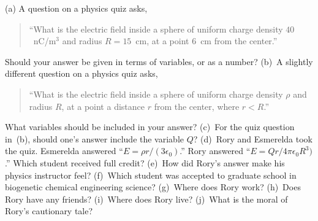 \begin{Exercise}
\label{rory_messed_up}
(a) A question on a physics quiz asks, 
\begin{quotation} 
``What is the electric field inside a sphere of uniform charge density $40$~nC/m$^3$ and radius $R=15$~cm, at a point 6~cm from the center.''
\end{quotation}  
Should your answer be given in terms of variables, or as a number?  (b)~A slightly different question on a physics quiz asks,
\begin{quotation} 
``What is the electric field inside a sphere of uniform charge density $\rho$ and radius $R$, at a point a distance $r$ from the center, where $r<R$.'' 
\end{quotation}  
What variables should be included in your answer?  
(c)~For the quiz question in~(b), should one's answer include the variable $Q$?  
(d)~Rory and Esmerelda took the quiz.  Esmerelda answered ``$E=\rho r/(3\epsilon_0)$.''  Rory answered ``$E=Qr / 4\pi \epsilon_0 R^3)$.'' Which student received full credit? 
(e)~How did Rory's answer make his physics instructor feel?  
(f)~Which student was accepted to graduate school in biogenetic chemical engineering science?  
(g)~Where does Rory work?  
(h)~Does Rory have any friends?  
(i)~Where does Rory live? 
(j)~What is the moral of Rory's cautionary tale?
\end{Exercise}
